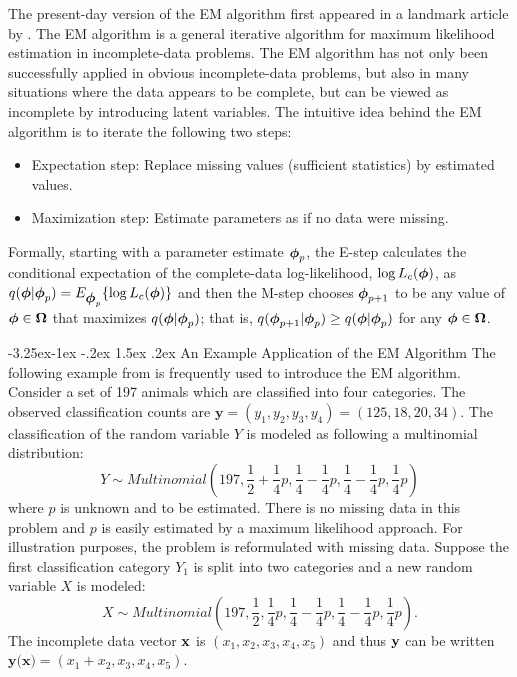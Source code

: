 \documentclass[10pt,twoside]{article}
\makeatletter
\renewcommand\subsection{\@startsection{subsection}{2}{\z@}%
                 {-3.25ex\@plus -1ex \@minus -.2ex}%
                 {1.5ex \@plus .2ex}%
                 {\scshape\centering\bfseries}} %
\makeatother
\begin{document}
The present-day version of
the EM algorithm first appeared in a landmark article by \cite{DLR}.
The EM algorithm is a general iterative algorithm for maximum likelihood
estimation in incomplete-data problems.  The EM algorithm has not only been
successfully applied in obvious incomplete-data problems, but also in many
situations where the data appears to be complete, but can be viewed as
incomplete by introducing latent variables.  
The intuitive idea behind the EM algorithm is to iterate the 
following two steps:
\begin{itemize}
\item [] Expectation step: Replace missing values (sufficient statistics) by
estimated
values.
\item [] Maximization step: Estimate parameters as if no data were missing.
\end{itemize}
Formally, starting with a parameter
estimate $\mbox{\boldmath $\phi$}_p$, the E-step calculates the
conditional expectation of the complete-data log-likelihood, 
$\log L_c(\mbox{\boldmath $\phi$})$, as
$q(\mbox{\boldmath $\phi$} | \mbox{\boldmath $\phi$}_p) = E_{\mbox{\boldmath $\phi$}_p} \{ \log L_c(\mbox{\boldmath $\phi$}) \}$
and then the M-step chooses 
$\mbox{\boldmath $\phi$}_{p+1}$ to be any value of $\mbox{\boldmath $\phi$} \in \mbox{\boldmath $\Omega$}$ that 
maximizes $q(\mbox{\boldmath $\phi$} | \mbox{\boldmath $\phi$}_p)$; that is,
$q(\mbox{\boldmath $\phi$}_{p+1} | \mbox{\boldmath $\phi$}_p) \geq q(\mbox{\boldmath $\phi$} | \mbox{\boldmath $\phi$}_p)$ for any 
$\mbox{\boldmath $\phi$} \in \mbox{\boldmath $\Omega$}$.

\subsection{An Example Application of the EM Algorithm}
\label{subsec:trademint}
The following example from \cite{DLR} 
is frequently used to introduce the 
EM algorithm.  Consider a set of 197 animals
which are classified into four categories.  The observed classification
counts
are $\mathbf{y} = (y_1, y_2, y_3, y_4) = (125, 18, 20, 34) $.  The
classification of the random variable $Y$ is 
modeled as following a multinomial distribution:
$$
Y \sim Multinomial\left(197, \frac{1}{2} + \frac{1}{4} p,    
  \frac{1}{4} - \frac{1}{4} p, 
  \frac{1}{4} - \frac{1}{4} p, \frac{1}{4} p \right)$$ 
where $p$ is unknown and to be estimated.  There is no missing data in this
problem and 
$p$ is easily estimated by a maximum likelihood approach.  For illustration
 purposes, the problem is reformulated with
missing data.  Suppose the first classification category $Y_1$ is split
into two categories and a new random variable $X$ is modeled:
$$
X \sim Multinomial\left(197, \frac{1}{2}, \frac{1}{4}p, 
  \frac{1}{4} - \frac{1}{4} p , 
  \frac{1}{4} - \frac{1}{4} p , \frac{1}{4} p\right).$$
The incomplete data vector ${\bf x}$ is $(x_1, x_2, x_3, x_4, x_5) $ 
and thus ${\bf y}$ can be written
$ \mathbf{y ( }\mathbf{x}) = (x_1 + x_2, x_3, x_4, x_5)$.
\end{document}
